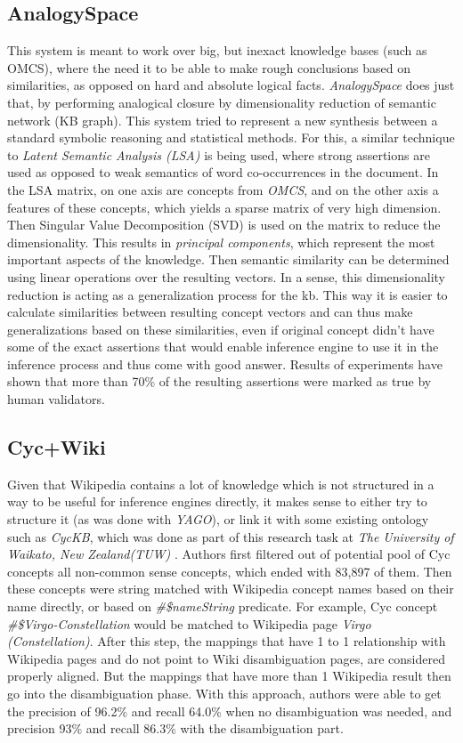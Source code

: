\subsection{AnalogySpace}
This system is meant to work over big, but inexact knowledge bases 
(such as OMCS), where the need it to be able to make rough conclusions based
on similarities, as opposed on hard and absolute logical facts. 
\emph{AnalogySpace} does just that, by performing analogical closure by
dimensionality reduction of semantic network (KB graph)\parencite{Speer2008}. 
This system tried to represent a new synthesis between a standard symbolic 
reasoning and statistical methods. For this, a similar technique to 
\emph{Latent Semantic Analysis (LSA)} is being used, where strong assertions
are used as
opposed to weak semantics of word co-occurrences in the document. In the 
LSA matrix, on one axis are concepts from \emph{OMCS}, and on the other
axis a features of these concepts, which yields a sparse matrix of very
high dimension. Then Singular Value Decomposition (SVD) is used on the matrix
to reduce the dimensionality. This results in \emph{principal components},
which represent the most important aspects of the knowledge. Then semantic
similarity can be determined using linear operations over the resulting vectors.
In a sense, this dimensionality reduction is acting as a generalization process
for the kb. This way it is easier to calculate similarities between resulting
concept vectors and can thus make generalizations based on these similarities,
even if original concept didn't have some of the exact assertions that would
enable inference engine to use it in the inference process and thus come with
good answer. 
Results of experiments have shown that more than 70\% of the resulting 
assertions were marked as true by human validators.

\subsection{Cyc+Wiki}
\label{section:r:cycwiki}
Given that Wikipedia contains a lot of knowledge which is not structured in 
a way to be useful for inference engines directly, it makes sense to either try
to structure it (as was done with \emph{YAGO}), or link it with some existing
ontology such as \emph{CycKB}, which was done as part of this research task
at \emph{The University of Waikato, New Zealand(TUW)} \parencite{Medelyan2008}.
Authors first filtered out of potential pool of Cyc concepts all non-common 
sense concepts, which ended with 83,897 of them. Then these concepts were
string matched with Wikipedia concept names based on their name directly,
or based on \emph{\#\$nameString} predicate. For example, Cyc concept
\emph{\#\$Virgo-Constellation} would be matched to Wikipedia page 
\emph{Virgo (Constellation)}. After this step, the mappings that have 1 to 1
relationship with Wikipedia pages and do not point to Wiki disambiguation pages,
are considered properly aligned. But the mappings that have more than 1 
Wikipedia result then go into the disambiguation phase. With this approach,
authors were able to get the precision of 96.2\% and recall 64.0\% when no 
disambiguation was needed, and precision 93\% and recall 86.3\% with the 
disambiguation part.


